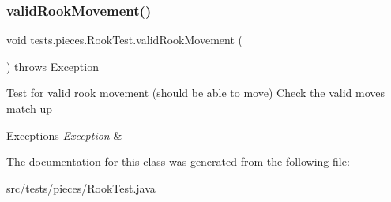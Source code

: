 \subsubsection{\texorpdfstring{valid\+Rook\+Movement()}{validRookMovement()}}
{\footnotesize\ttfamily void tests.\+pieces.\+Rook\+Test.\+valid\+Rook\+Movement (\begin{DoxyParamCaption}{ }\end{DoxyParamCaption}) throws Exception}

Test for valid rook movement (should be able to move) Check the valid moves match up 
\begin{DoxyExceptions}{Exceptions}
{\em Exception} & \\
\hline
\end{DoxyExceptions}


The documentation for this class was generated from the following file\+:\begin{DoxyCompactItemize}
\item 
src/tests/pieces/Rook\+Test.\+java\end{DoxyCompactItemize}
